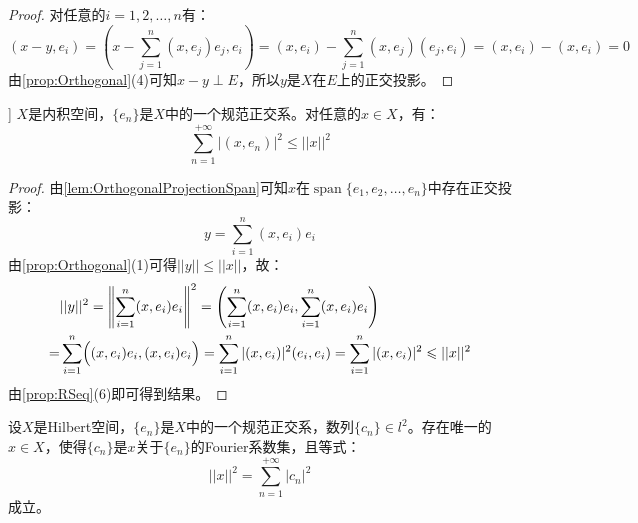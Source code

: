 \begin{proof}
	对任意的$i=1,2,\dots,n$有：
	\begin{equation*}
		(x-y,e_i)=\left(x-\sum_{j=1}^{n}(x,e_j)e_j,e_i\right)=(x,e_i)-\sum_{j=1}^{n}(x,e_j)(e_j,e_i)=(x,e_i)-(x,e_i)=0
	\end{equation*}
	由\cref{prop:Orthogonal}(4)可知$x-y\perp E$，所以$y$是$X$在$E$上的正交投影。
\end{proof}
\begin{theorem}]\label{theo:BesselInequality}
	$X$是内积空间，$\{e_n\}$是$X$中的一个规范正交系。对任意的$x\in X$，有：
	\begin{equation*}
		\sum_{n=1}^{+\infty}|(x,e_n)|^2\leqslant||x||^2
	\end{equation*}
\end{theorem}
\begin{proof}
	由\cref{lem:OrthogonalProjectionSpan}可知$x$在$\operatorname{span}\{e_1,e_2,\dots,e_n\}$中存在正交投影：
	\begin{equation*}
		y=\sum_{i=1}^{n}(x,e_i)e_i
	\end{equation*}
	由\cref{prop:Orthogonal}(1)可得$||y||\leqslant||x||$，故：
	\begin{align*}
		&||y||^2=\left\|\sum_{i=1}^{n}(x,e_i)e_i\right\|^2 =\left(\sum_{i=1}^{n}(x,e_i)e_i,\sum_{i=1}^{n}(x,e_i)e_i\right) \\
		=&\sum_{i=1}^n\Bigl((x,e_i)e_i,(x,e_i)e_i\Bigr) =\sum_{i=1}^n|(x,e_i)|^2(e_i,e_i) =\sum_{i=1}^n|(x,e_i)|^2\leqslant||x||^2
	\end{align*}
	由\cref{prop:RSeq}(6)即可得到结果。
\end{proof}
\begin{theorem}\label{theo:ParsevalIdentity}
	设$X$是Hilbert空间，$\{e_n\}$是$X$中的一个规范正交系，数列$\{c_n\}\in l^2$。存在唯一的$x\in X$，使得$\{c_n\}$是$x$关于$\{e_n\}$的Fourier系数集，且等式：
	\begin{equation*}
		||x||^2=\sum_{n=1}^{+\infty}|c_n|^2
	\end{equation*}
	成立。
\end{theorem}
